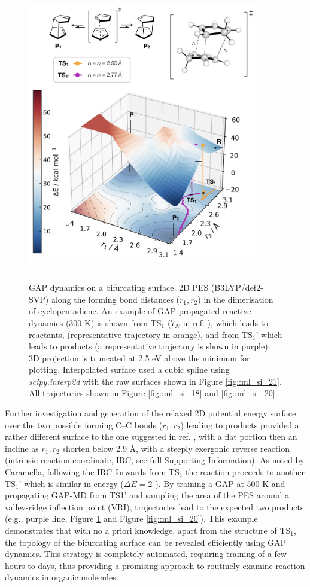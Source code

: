 \documentclass[../../main.tex]{subfiles}
\begin{document}
\begin{figure}[h!]
	\vspace{0.4cm}
	\centering
	\includegraphics[width=10cm]{6/gap/figs_ms/fig6}
	\vspace{0.2cm}
	\hrule
	\caption{GAP dynamics on a bifurcating surface. 2D PES (B3LYP/def2-SVP) along the forming bond distances ($r_1, r_2$) in the dimerisation of cyclopentadiene. An example of GAP-propagated reactive dynamics (300 K) is shown from TS${}_1$ ($7_N$ in ref. \cite{Caramella2002}), which leads to reactants, (representative trajectory in orange), and from TS${}_1’$ which leads to products (a representative trajectory is shown in purple). 3D projection is truncated at 2.5 eV above the minimum for plotting. Interpolated surface used a cubic spline using \emph{scipy.interp2d} with the raw surfaces shown in Figure \ref{fig::ml_si_21}. All trajectories shown in Figure \ref{fig::ml_si_18} and \ref{fig::ml_si_20}.}
	\label{fig::ml_6}
\end{figure}

Further investigation and generation of the relaxed 2D potential energy surface over the two possible forming C–C bonds ($r_1, r_2$) leading to products provided a rather different surface to the one suggested in ref. \cite{Caramella2002}, with a flat portion then an incline as $r_1, r_2$ shorten below 2.9 \AA, with a steeply exergonic reverse reaction (intrinsic reaction coordinate, IRC, see full Supporting Information). As noted by Caramella, following the IRC forwards from TS${}_1$ the reaction proceeds to another TS${}_1$’ which is similar in energy ($\Delta E = 2$ \kcal). By training a GAP at 500 K and propagating GAP-MD from TS1’ and sampling the area of the PES around a valley-ridge inflection point (VRI), trajectories lead to the expected two products (e.g., purple line, Figure \ref{fig::ml_6} and Figure \ref{fig::ml_si_20}). This example demonstrates that with no a priori knowledge, apart from the structure of TS${}_1$, the topology of the bifurcating surface can be revealed efficiently using GAP dynamics. This strategy is completely automated, requiring training of a few hours to days, thus providing a promising approach to routinely examine reaction dynamics in organic molecules.
\end{document}
